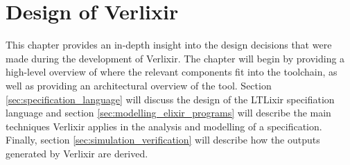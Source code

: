 \chapter{Design of Verlixir} \label{chap:design}
This chapter provides an in-depth insight into the design decisions that were made during the development of Verlixir. The chapter will begin by providing a high-level overview of where the relevant components fit into the toolchain, as well as providing an architectural overview of the tool. Section \ref{sec:specification_language} will discuss the design of the LTLixir specifiation language and section \ref{sec:modelling_elixir_programs} will describe the main techniques Verlixir applies in the analysis and modelling of a specification. Finally, section \ref{sec:simulation_verification} will describe how the outputs generated by Verlixir are derived.  
